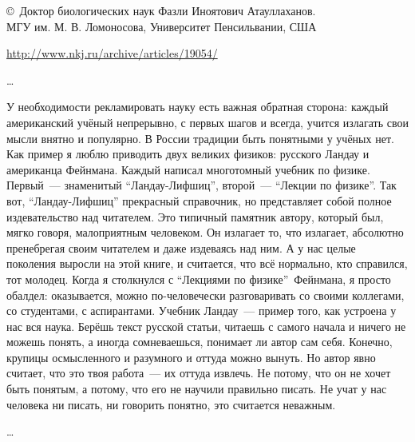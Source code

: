 
\copyright\ Доктор биологических наук Фазли Иноятович Атауллаханов.\\
МГУ им. М. В. Ломоносова, Университет Пенсильвании, США

\bigskip 
\url{http://www.nkj.ru/archive/articles/19054/}
\bigskip 

\ldots

У необходимости рекламировать науку есть важная обратная сторона: каждый
американский учёный непрерывно, с первых шагов и всегда, учится излагать свои
мысли внятно и популярно. В России традиции быть понятными у учёных нет. Как
пример я люблю приводить двух великих физиков: русского Ландау и американца
Фейнмана. Каждый написал многотомный учебник по физике. Первый\ --- знаменитый
``Ландау-Лифшиц'', второй\ --- ``Лекции по физике''. Так вот, ``Ландау-Лифшиц''
прекрасный справочник, но представляет собой полное издевательство над
читателем. Это типичный памятник автору, который был, мягко говоря, малоприятным
человеком. Он излагает то, что излагает, абсолютно пренебрегая своим читателем и
даже издеваясь над ним. А у нас целые поколения выросли на этой книге, и
считается, что всё нормально, кто справился, тот молодец. Когда я столкнулся с
``Лекциями по физике''\ Фейнмана, я просто обалдел: оказывается, можно
по-человечески разговаривать со своими коллегами, со студентами, с аспирантами.
Учебник Ландау\ --- пример того, как устроена у нас вся наука. Берёшь текст
русской статьи, читаешь с самого начала и ничего не можешь понять, а иногда
сомневаешься, понимает ли автор сам себя. Конечно, крупицы осмысленного и
разумного и оттуда можно вынуть. Но автор явно считает, что это твоя работа\ ---
их оттуда извлечь. Не потому, что он не хочет быть понятым, а потому, что его не
научили правильно писать. Не учат у нас человека ни писать, ни говорить понятно,
это считается неважным.

\ldots